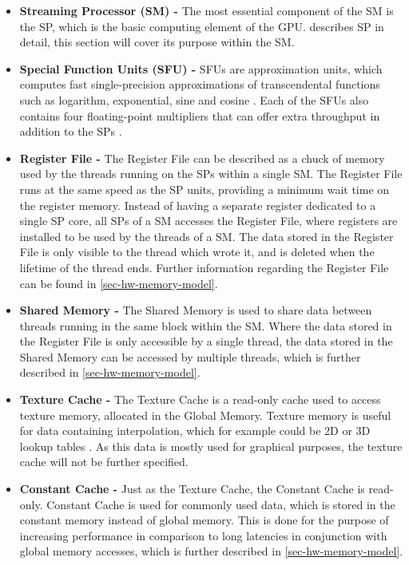 \begin{itemize}
	\item \textbf{Streaming Processor (SM) -}  The most essential component of the SM is the SP, which is the basic computing element of the GPU.
	 describes SP in detail, this section will cover its purpose within the SM.
	
	\item \textbf{Special Function Units (SFU) -} SFUs are approximation units, which computes fast single-precision approximations of transcendental functions such as logarithm, exponential, sine and cosine \cite{Wilt2013}.
	Each of the SFUs also contains four floating-point multipliers that can offer extra throughput in addition to the SPs \cite{Li2016}.
	
	\item \textbf{Register File -} The Register File can be described as a chuck of memory used by the threads running on the SPs within a single SM. 
	The Register File runs at the same speed as the SP units, providing a minimum wait time on the register memory. 
	Instead of having a separate register dedicated to a single SP core, all SPs of a SM accesses the Register File, where registers are installed to be used by the threads of a SM.
	The data stored in the Register File is only visible to the thread which wrote it, and is deleted when the lifetime of the thread ends.
	Further information regarding the Register File can be found in \cref{sec-hw-memory-model}.
	
	\item \textbf{Shared Memory -} The Shared Memory is used to share data between threads running in the same block within the SM.
	Where the data stored in the Register File is only accessible by a single thread, the data stored in the Shared Memory can be accessed by multiple threads, which is further described in \cref{sec-hw-memory-model}.
		
	\item \textbf{Texture Cache -} The Texture Cache is a read-only cache used to access texture memory, allocated in the Global Memory.
	Texture memory is useful for data containing interpolation, which for example could be 2D or 3D lookup tables \cite{Cook2008}.
	As this data is mostly used for graphical purposes, the texture cache will not be further specified.
	
	\item \textbf{Constant Cache -} Just as the Texture Cache, the Constant Cache is read-only.
	Constant Cache is used for commonly used data, which is stored in the constant memory instead of global memory.
	This is done for the purpose of increasing performance in comparison to long latencies in conjunction with global memory accesses, which is further described in \cref{sec-hw-memory-model}.
	

\end{itemize}
